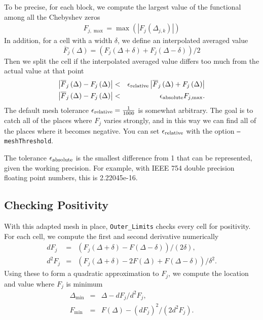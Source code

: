 \documentclass[12pt]{article}
\numberwithin{equation}{section}
\begin{document}
To be precise, for each block, we compute the largest value of the
functional among all the Chebyshev zeros
\begin{eqnarray}
  F_{j,\max} = \max \left( \left| F_{j} \left(\Delta_{j,k} \right) \right| \right)
\end{eqnarray}
In addition, for a cell with a width $\delta$, we define an interpolated averaged value
\begin{equation}
  \overline{F}_j\left(\Delta\right) = \left( F_j\left(\Delta + \delta\right) + F_j\left(\Delta - \delta\right) \right) /2
\end{equation}
Then we split the cell if the interpolated averaged value differs too
much from the actual value at that point
\begin{eqnarray}
  \left|\overline{F}_j\left(\Delta\right) - F_j\left(\Delta\right)\right| & < & \epsilon_{\rm{relative}} \left|\overline{F}_j\left(\Delta\right) + F_j\left(\Delta\right)\right| \\
  \left|\overline{F}_j\left(\Delta\right) - F_j\left(\Delta\right)\right| & < & \epsilon_{\rm{absolute}} F_{j,\max}.
\end{eqnarray}
The default mesh tolerance $\epsilon_{\rm{relative}}=\frac{1}{1000}$ is somewhat
arbitrary.  The goal is to catch all of the places where $F_j$ varies
strongly, and in this way we can find all of the places where it
becomes negative.  You can set $\epsilon_{\rm{relative}}$ with the
option \texttt{--meshThreshold}.

The tolerance $\epsilon_{\rm{absolute}}$ is the smallest difference from 1
that can be represented, given the working precision.  For example,
with IEEE 754 double precision floating point numbers, this is
2.22045e-16.

\subsection{Checking Positivity}
\label{subsec:checkingpositivity}

With this adapted mesh in place, \texttt{Outer\_Limits} checks every
cell for positivity. For each cell, we compute the first and
second derivative numerically
\begin{eqnarray}
  dF_{j} & = &\left( F_{j}\left( \Delta + \delta \right) - F\left( \Delta - \delta \right) \right)/\left( 2 \delta \right),\\
  d^{2}F_{j} & = & \left( F_{j}\left( \Delta + \delta \right) - 2 F\left( \Delta \right) + F\left( \Delta - \delta \right) \right)/ \delta^2.
\end{eqnarray}
Using these to form a quadratic approximation to $F_{j}$, we compute
the location and value where $F_{j}$ is minimum
\begin{eqnarray}
  \Delta_{\min} & = & \Delta - dF_{j}/d^{2}F_{j},\\
  F_{\min} & = & F\left(\Delta\right) - \left(dF_{j}\right)^{2} /\left( 2 d^{2}F_{j}\right).
\end{eqnarray}
\end{document}

